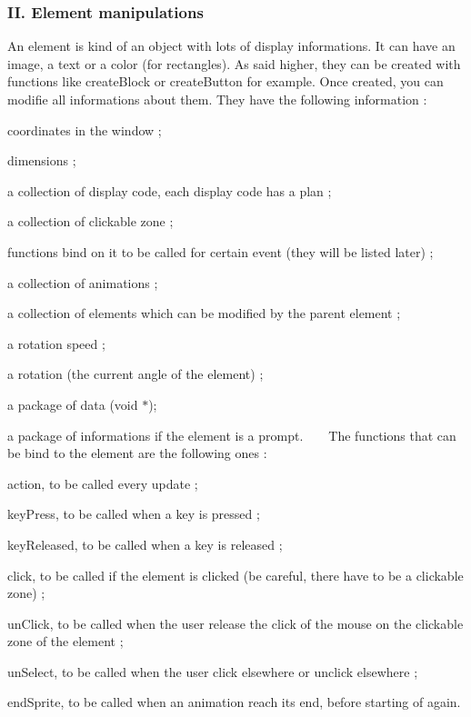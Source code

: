 \subsubsection*{II. Element manipulations}

An element is kind of an object with lots of display informations. It can have an image, a text or a color (for rectangles). As said higher, they can be created with functions like create\+Block or create\+Button for example. Once created, you can modifie all informations about them. They have the following information \+:
\begin{DoxyItemize}
\item coordinates in the window ;
\item dimensions ;
\item a collection of display code, each display code has a plan ;
\item a collection of clickable zone ;
\item functions bind on it to be called for certain event (they will be listed later) ;
\item a collection of animations ;
\item a collection of elements which can be modified by the parent element ;
\item a rotation speed ;
\item a rotation (the current angle of the element) ;
\item a package of data (void $\ast$);
\item a package of informations if the element is a prompt. ~\newline
~\newline
 The functions that can be bind to the element are the following ones \+:
\begin{DoxyItemize}
\item action, to be called every update ;
\end{DoxyItemize}
\item key\+Press, to be called when a key is pressed ;
\item key\+Released, to be called when a key is released ;
\item click, to be called if the element is clicked (be careful, there have to be a clickable zone) ;
\item un\+Click, to be called when the user release the click of the mouse on the clickable zone of the element ;
\item un\+Select, to be called when the user click elsewhere or unclick elsewhere ;
\item end\+Sprite, to be called when an animation reach its end, before starting of again. ~\newline

\end{DoxyItemize}
